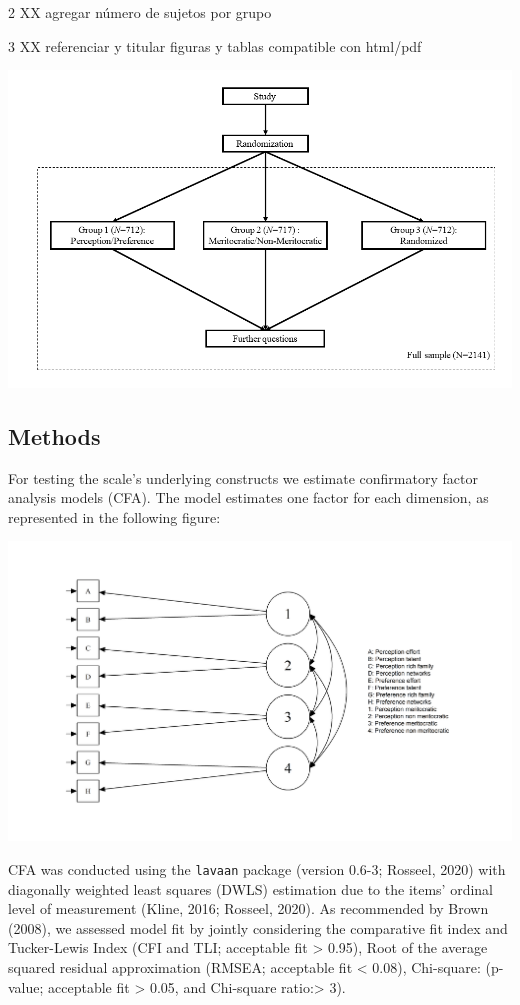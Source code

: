 \documentclass[
]{article}
\begin{document}
2 XX agregar número de sujetos por grupo

3 XX referenciar y titular figuras y tablas compatible con html/pdf

\includegraphics{../input/images/app_mod.png}

\hypertarget{methods}{%
\subsection{Methods}\label{methods}}

For testing the scale's underlying constructs we estimate confirmatory
factor analysis models (CFA). The model estimates one factor for each
dimension, as represented in the following figure:

\includegraphics{../output/images/meas01.png}

CFA was conducted using the \texttt{lavaan} package (version 0.6-3;
Rosseel, 2020) with diagonally weighted least squares (DWLS) estimation
due to the items' ordinal level of measurement (Kline, 2016; Rosseel,
2020). As recommended by Brown (2008), we assessed model fit by jointly
considering the comparative fit index and Tucker-Lewis Index (CFI and
TLI; acceptable fit \textgreater{} 0.95), Root of the average squared
residual approximation (RMSEA; acceptable fit \textless{} 0.08),
Chi-square: (p-value; acceptable fit \textgreater{} 0.05, and Chi-square
ratio:\textgreater{} 3).
\end{document}
